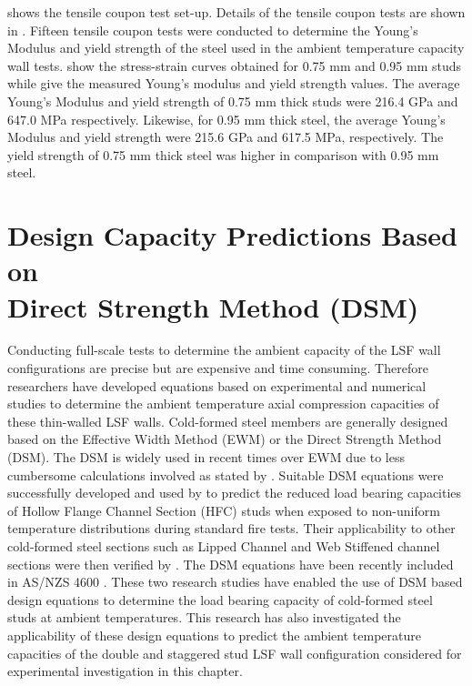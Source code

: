  shows the tensile coupon test set-up. Details of the tensile coupon tests are shown in . Fifteen tensile coupon tests were conducted to determine the Young's Modulus and yield strength of the steel used in the ambient temperature capacity wall tests.  show the stress-strain curves obtained for 0.75 mm and 0.95 mm studs while  give the measured Young's modulus and yield strength values. The average Young's Modulus and yield strength of 0.75 mm thick studs were 216.4 GPa and 647.0 MPa respectively. Likewise, for 0.95 mm thick steel, the average Young's Modulus and yield strength were 215.6 GPa and 617.5 MPa, respectively. The yield strength of 0.75 mm thick steel was higher in comparison with 0.95 mm steel. 

\section[Design Capacity Predictions Based on Direct Strength Method (DSM)]{Design Capacity Predictions Based on \\Direct Strength Method (DSM)}

Conducting full-scale tests to determine the ambient capacity of the LSF wall configurations are precise but are expensive and time consuming. Therefore researchers have developed equations based on experimental and numerical studies to determine the ambient temperature axial compression capacities of these thin-walled LSF walls. Cold-formed steel members are generally designed based on the Effective Width Method (EWM) or the Direct Strength Method (DSM). The DSM is widely used in recent times over EWM due to less cumbersome calculations involved as stated by \citet{Yu2007,Schafer2008b,Shahbazian2011,Shahbazian2012}. Suitable DSM equations were successfully developed and used by \citet{Kesawan2016} to predict the reduced load bearing capacities of Hollow Flange Channel Section (HFC) studs when exposed to non-uniform temperature distributions during standard fire tests. Their applicability to other cold-formed steel sections such as Lipped Channel and Web Stiffened channel sections were then verified by \citet{Rusthi2018}. The DSM equations have been recently included in AS/NZS 4600 \citet{ASNZ4600}. These two research studies \citet{Kesawan2016,Rusthi2018} have enabled the use of DSM based design equations to determine the load bearing capacity of cold-formed steel studs at ambient temperatures. This research has also investigated the applicability of these design equations to predict the ambient temperature capacities of the double and staggered stud LSF wall configuration considered for experimental investigation in this chapter.

